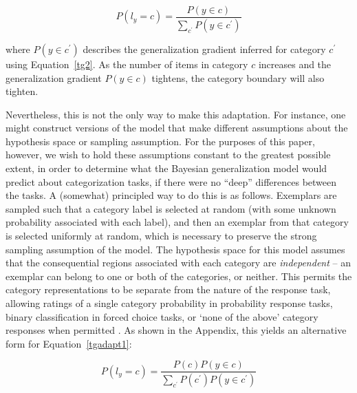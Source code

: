 \documentclass[doc,apacite]{apa6}
\begin{document}
\begin{equation}
\label{tgadapt1}
P(l_y = c) =  \frac{P(y \in c)}{\sum_{c^\prime} P(y \in c^\prime)}
\end{equation}

\noindent
where $P(y \in c^\prime)$ describes the generalization gradient inferred for category $c^\prime$ using Equation~\ref{tg2}. As the number of items in category $c$ increases and the generalization gradient $P(y \in c)$ tightens, the category boundary will also tighten.

Nevertheless, this is not the only way to make this adaptation. For instance, one might construct versions of the model that make different assumptions about the hypothesis space or sampling assumption. For the purposes of this paper, however, we wish to hold these assumptions constant to the greatest possible extent, in order to determine what the Bayesian generalization model would predict about categorization tasks, if there were no ``deep'' differences between the tasks. A (somewhat) principled way to do this is as follows. Exemplars are sampled such that a category label is selected at random (with some unknown probability associated with each label), and then an exemplar from that category is selected uniformly at random, which is necessary to preserve the strong sampling assumption of the model. The hypothesis space for this model assumes that the consequential regions associated with each category are {\it independent} -- an exemplar can belong to one or both of the categories, or neither. This permits the category representations to be separate from the nature of the response task, allowing ratings of a single category probability in {\sc probability} response tasks, binary classification in {\sc forced choice} tasks, or `none of the above' category responses when permitted \cite{navarrosubmittednone}.
As shown in the Appendix, this yields an alternative form for Equation~\ref{tgadapt1}:

\begin{equation}
\label{tgadapt2}
P(l_y = c) =  \frac{P(c) P(y \in c)}{\sum_{c^\prime} P(c^\prime) P(y \in c^\prime)}
\end{equation}
\end{document}
